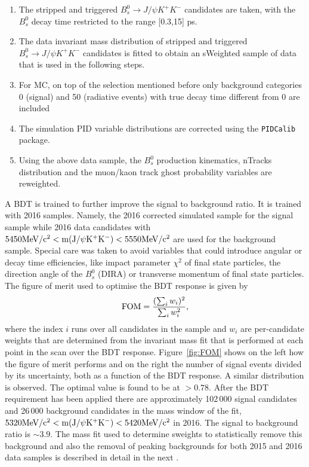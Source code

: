 \begin{enumerate}
        \item The stripped and triggered $B_s^0 \to J/\psi K^+K^-$ candidates are taken, with the $B_s^0$ decay time restricted to the range [0.3,15] ps. 
	\item The data invariant mass distribution of stripped and triggered $B_s^0 \to J/\psi K^+K^-$  candidates is fitted to obtain an sWeighted sample of data that is used in the following steps.
        \item For MC, on top of the selection mentioned before only background categories 0 (signal) and 50 (radiative events) with true decay time different from 0 are included %
	\item The simulation PID variable distributions are corrected using the {\tt PIDCalib} package.
	\item Using the above data sample, the $B_s^0$ production kinematics, nTracks distribution and the muon/kaon track ghost probability variables are reweighted.
\end{enumerate}

A BDT is trained to further improve the signal to background ratio. It is trained with 2016 samples. Namely, the 2016 corrected simulated sample for the signal sample while 2016 data candidates with $5450\rm MeV/c^2 < m(J/\psi K^+ K^-) < 5550\rm MeV/c^2$ are used
for the background sample.
Special care was taken to avoid variables that could introduce angular or decay time efficiencies, like impact parameter $\chi^2$ of final
state particles, the direction angle of the $B^0_s$ (DIRA) or transverse momentum of final state particles.
The figure of merit used to optimise the BDT response is given by
\begin{equation}
	{\rm FOM} = \frac{(\sum_i w_i)^2}{\sum_i w_i^2},
\end{equation}
where the index $i$ runs over all candidates in the sample and  $w_i$ are
per-candidate weights that are determined from the invariant mass fit
that is performed at each point in the scan over the BDT response. Figure~\ref{fig:FOM} shows on the left how the figure of merit performs and on the right the number of signal events divided by its uncertainty, both as a function of the BDT response. A similar distribution is observed. The optimal value is found to be at $> 0.78$.
After the BDT requirement has been applied there are
approximately 102\,000 signal candidates and 26\,000 background candidates
in the mass window of the fit, $5320\rm MeV/c^2 < m(J/\psi K^+ K^-) < 5420\rm MeV/c^2$ in 2016. The signal to background ratio is $\sim 3.9$. 
The mass fit used to determine sweights to statistically
remove this background and also the removal of peaking backgrounds for both 2015 and 2016 data samples is described in detail in the next .

